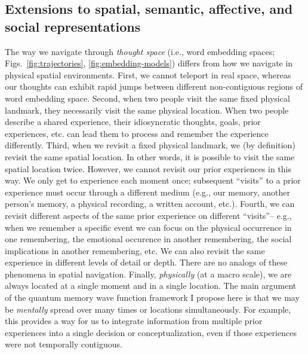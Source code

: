 \documentclass{article}
\begin{document}
\subsection*{Extensions to spatial, semantic, affective, and social representations}
The way we navigate through \textit{thought space} (i.e., word embedding spaces; Figs.~\ref{fig:trajectories}, \ref{fig:embedding-models}) differs from how we navigate in physical spatial environments.  First, we cannot teleport in real space, whereas our thoughts can exhibit rapid jumps between different non-contiguous regions of word embedding space.  Second, when two people visit the same fixed physical landmark, they necessarily visit the same physical location.  When two people describe a shared experience, their idiosyncratic thoughts, goals, prior experiences, etc. can lead them to process and remember the experience differently.  Third, when we revisit a fixed physical landmark, we (by definition) revisit the same spatial location.  In other words, it is possible to visit the same spatial location twice.  However, we cannot revisit our prior experiences in this way.  We only get to experience each moment once; subsequent ``visits'' to a prior experience must occur through a different medium (e.g., our memory, another person’s memory, a physical recording, a written account, etc.).  Fourth, we can revisit different aspects of the same prior experience on different ``visits''-- e.g., when we remember a specific event we can focus on the physical occurrence in one remembering, the emotional occurence in another remembering, the social implications in another remembering, etc.  We can also revisit the same experience in different levels of detail or depth.  There are no analogs of these phenomena in spatial navigation.  Finally, \textit{physically} (at a macro scale), we are always located at a single moment and in a single location.  The main argument of the quantum memory wave function framework I propose here is that we may be \textit{mentally} spread over many times or locations simultaneously.  For example, this provides a way for us to integrate information from multiple prior experiences into a single decision or conceptualization, even if those experiences were not temporally contiguous.
\end{document}
